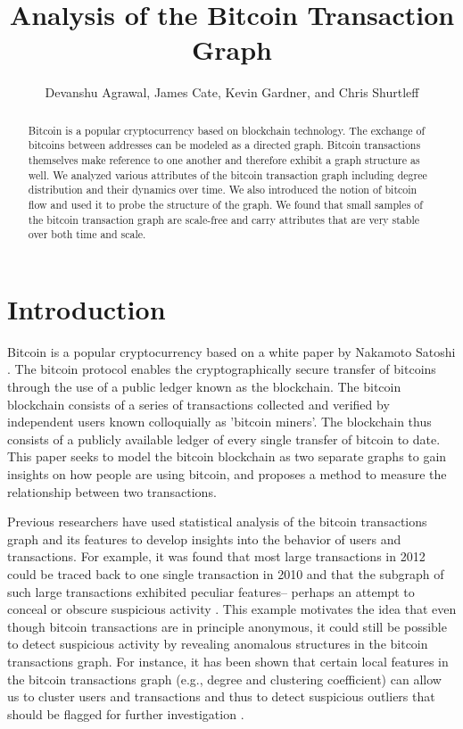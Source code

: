 \documentclass[letterpaper, 10 pt, conference]{ieeeconf}  %
\title{\LARGE \bf
Analysis of the Bitcoin Transaction Graph
}
\author{Devanshu Agrawal, James Cate, Kevin Gardner, and  Chris Shurtleff%
}
\begin{document}
\maketitle
\thispagestyle{empty}
\pagestyle{empty}


\begin{abstract}
Bitcoin is a popular cryptocurrency based on blockchain technology. The exchange of bitcoins between addresses can be modeled as a directed graph. Bitcoin transactions themselves make reference to one another and therefore exhibit a graph structure as well. We analyzed various attributes of the bitcoin transaction graph including degree distribution and their dynamics over time. We also introduced the notion of bitcoin flow and used it to probe the structure of the graph. We found that small samples of the bitcoin transaction graph are scale-free and carry attributes that are very stable over both time and scale.
\end{abstract}


\section{Introduction}

Bitcoin is a popular cryptocurrency based on a white paper by Nakamoto Satoshi \cite{sat2008}. The bitcoin protocol enables the cryptographically secure transfer of bitcoins through the use of a public ledger known as the blockchain. The bitcoin blockchain consists of a series of transactions collected and verified by independent users known colloquially as 'bitcoin miners'. The blockchain thus consists of a publicly available ledger of every single transfer of bitcoin to date. This paper seeks to model the bitcoin blockchain as two separate graphs to gain insights on how people are using bitcoin, and proposes a method to measure the relationship between two transactions.

Previous researchers have used statistical analysis of the bitcoin transactions graph and its features to develop insights into the behavior of users and transactions. For example, it was found that most large transactions in 2012 could be traced back to one single transaction in 2010 and that the subgraph of such large transactions exhibited peculiar features-- perhaps an attempt to conceal or obscure suspicious activity \cite{ron2012}. This example motivates the idea that even though bitcoin transactions are in principle anonymous, it could still be possible to detect suspicious activity by revealing anomalous structures in the bitcoin transactions graph. For instance, it has been shown that certain local features in the bitcoin transactions graph (e.g., degree and clustering coefficient) can allow us to cluster users and transactions and thus to detect suspicious outliers that should be flagged for further investigation \cite{pham2016, zambre2013}.
\end{document}
